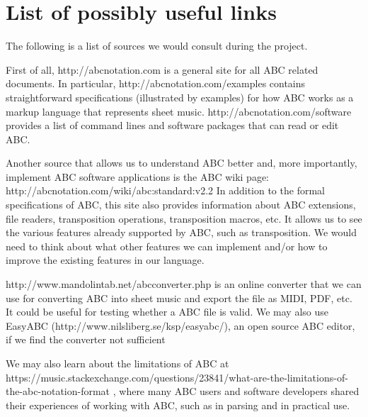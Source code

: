 \section{List of possibly useful links}
The following is a list of sources we would consult during the project. 

First of all, http://abcnotation.com is a general site for all ABC related documents. In particular, http://abcnotation.com/examples contains straightforward specifications (illustrated by examples) for how ABC works as a markup language that represents sheet music. http://abcnotation.com/software provides a list of command lines and software packages that can read or edit ABC. 

Another source that allows us to understand ABC better and, more importantly, implement ABC software applications is the ABC wiki page: http://abcnotation.com/wiki/abc:standard:v2.2 In addition to the formal specifications of ABC, this site also provides information about ABC extensions, file readers, transposition operations, transposition macros, etc. It allows us to see the various features already supported by ABC, such as transposition. We would need to think about what other features we can implement and/or how to improve the existing features in our language.

http://www.mandolintab.net/abcconverter.php is an online converter that we can use for converting ABC into sheet music and export the file as MIDI, PDF, etc. It could be useful for testing whether a ABC file is valid. We may also use EasyABC (http://www.nilsliberg.se/ksp/easyabc/), an open source ABC editor, if we find the converter not sufficient

We may also learn about the limitations of ABC at https://music.stackexchange.com/questions/23841/what-are-the-limitations-of-the-abc-notation-format
, where many ABC users and software developers shared their experiences of working with ABC, such as in parsing and in practical use.
